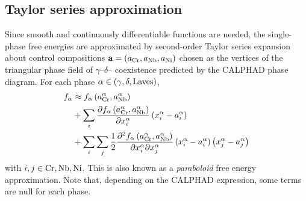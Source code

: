 \documentclass[10pt]{article}
\begin{document}
		\subsection{Taylor series approximation}
		Since smooth and continuously differentiable functions are needed, the single-phase free energies are approximated
		by second-order Taylor series expansion about control compositions $\mathbf{a}=(a_{\ce{Cr}}, a_{\ce{Nb}}, a_{\ce{Ni}})$
		chosen as the vertices of the triangular phase field of $\gamma$--$\delta$-- coexistence predicted by the CALPHAD phase diagram.
		For each phase $\alpha\in(\gamma,\delta,\ce{Laves})$,
		\begin{align}\nonumber
			f_{\alpha} &\approx f_{\alpha}\left(a_{\ce{Cr}}^{\alpha}, a_{\ce{Nb}}^{\alpha}\right)\\\nonumber
	                            &+ \sum\limits_{i}\frac{\partial f_{\alpha}\left(a_{\ce{Cr}}^{\alpha}, a_{\ce{Nb}}^{\alpha}\right)}{\partial x_i^{\alpha}}
	                              \left(x_i^{\alpha} - a_i^{\alpha}\right)\\
	                            &+ \sum\limits_{i}\sum\limits_{j}\frac{1}{2}\frac{\partial^2 f_{\alpha}\left(a_{\ce{Cr}}^{\alpha}, a_{\ce{Nb}}^{\alpha}\right)}
	                              {\partial x_i^{\alpha} \partial x_j^{\alpha}}
	                              \left(x_i^{\alpha} - a_i^{\alpha}\right)\left(x_j^{\alpha} - a_j^{\alpha}\right)
		\end{align}
		with $i,j\in\ce{Cr},\ce{Nb},\ce{Ni}$.
		This is also known as a \emph{paraboloid} free energy approximation.
		Note that, depending on the CALPHAD expression, some terms are null for each phase.
\end{document}
